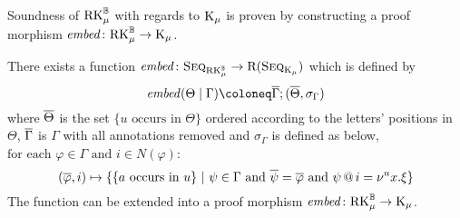 Soundness of $\mathrm{RK}_\mu^{\mathbb{B}}$ with regards to $\mathrm{K}_\mu$ is proven by constructing a proof
morphism $\mathit{embed} \colon \mathrm{RK}_\mu^{\mathbb{B}} \to \mathrm{K}_\mu$.

\begin{lemma}
  There exists a function $\mathit{embed} \colon \textsc{Seq}_{\mathrm{RK}_\mu^{\mathbb{B}}} \to \mathrm{R}(\textsc{Seq}_{\mathrm{K}_\mu})$ which is defined by
  \[\embed(\Theta \rsep \Gamma) \coloneq \ol{\Gamma} ; (\ol{\Theta}, \sigma_\Gamma) \]
  where $\overline{\Theta}$ is the set $\{u \text{ occurs in } \Theta\}$ ordered
  according to the letters' positions in $\Theta$, $\overline{\Gamma}$ is $\Gamma$
  with all annotations removed and $\sigma_\Gamma$ is defined as below, \(
  \text{for each } \varphi \in \Gamma \text{ and } i \in N(\varphi) \):
  \[
    (\overline{\varphi}, i) \mapsto \{\{a \text{ occurs in } u\} ~|~ \psi \in \Gamma
    \text{ and } \overline{\psi} = \overline{\varphi} \text{ and } \psi \,@\, i = \nu^u x.
    \xi\} 
  \]
  The function can be extended into a proof morphism $\mathit{embed} \colon \mathrm{RK}_\mu^{\mathbb{B}} \to \mathrm{K}_\mu$.
\end{lemma}
